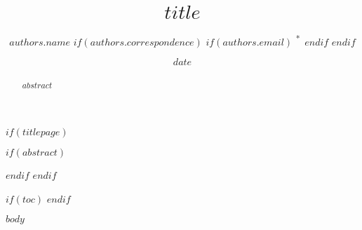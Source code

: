 \documentclass[11pt,a4paper]{article}
\title{$title$}
\author[$for(authors.institute)$$authors.institute$$sep$,$endfor$]{$authors.name$%
	$if(authors.correspondence)$%
	$if(authors.email)$%
	\textsuperscript{*\,}%
    $endif$%
    $endif$%
}%
\affil[$institute.index$]{$institute.name$}
\date{$date$}
\begin{document}
	
$if(titlepage)$
\maketitle
$if(abstract)$
\begin{abstract}
$abstract$
\end{abstract}
$endif$
\thispagestyle{empty}
\restoregeometry
\newpage
$endif$

$if(toc)$
\newpage
\tableofcontents
\newpage
$endif$

$body$
\end{document}
